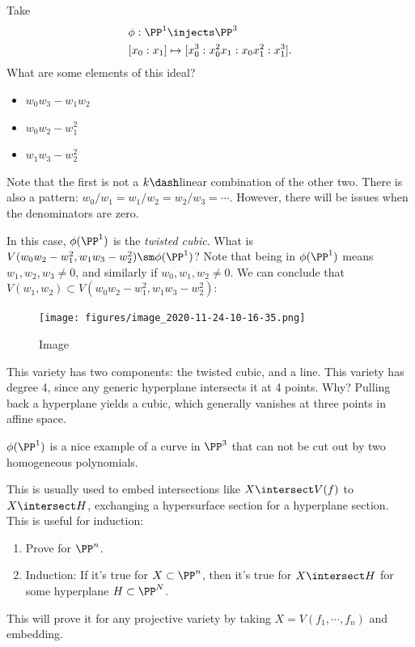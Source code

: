 \begin{example}[?]

Take
\begin{align*}  
\phi: \PP^1 &\injects \PP^3 \\
[x_0: x_1] &\mapsto [x_0^3: x_0^2 x_1 : x_0 x_1^2: x_1^3]
.\end{align*} What are some elements of this ideal?

\begin{itemize}
\tightlist
\item
  \(w_0 w_3 - w_1 w_2\)
\item
  \(w_0 w_2 - w_1^2\)
\item
  \(w_1 w_3 - w_2^2\)
\end{itemize}

Note that the first is not a \(k\dash\)linear combination of the other
two. There is also a pattern:
\(w_0/w_1 = w_1 / w_2 = w_2/w_3 = \cdots\). However, there will be
issues when the denominators are zero.

In this case, \(\phi(\PP^1)\) is the \emph{twisted cubic}. What is
\(V(w_0 w_2 - w_1^2, w_1 w_3 - w_2^2) \sm \phi(\PP^1)\)? Note that being
in \(\phi(\PP^1)\) means \(w_1, w_2, w_3 \neq 0\), and similarly if
\(w_0, w_1, w_2 \neq 0\). We can conclude that
\(V(w_1, w_2) \subset V(w_0 w_2 - w_1^2, w_1 w_3 - w_2^2)\):

\begin{figure}
\centering
\texttt{[image: figures/image\_2020-11-24-10-16-35.png]}
\caption{Image}
\end{figure}

This variety has two components: the twisted cubic, and a line. This
variety has degree 4, since any generic hyperplane intersects it at 4
points. Why? Pulling back a hyperplane yields a cubic, which generally
vanishes at three points in affine space.

\end{example}

\begin{remark}

\(\phi(\PP^1)\) is a nice example of a curve in \(\PP^3\) that can not
be cut out by two homogeneous polynomials.

\end{remark}

\begin{remark}

This is usually used to embed intersections like \(X\intersect V(f)\) to
\(X\intersect H\), exchanging a hypersurface section for a hyperplane
section. This is useful for induction:

\begin{enumerate}
\def\labelenumi{\arabic{enumi}.}
\tightlist
\item
  Prove for \(\PP^n\).
\item
  Induction: If it's true for \(X \subset\PP^n\), then it's true for
  \(X \intersect H\) for some hyperplane \(H \subset\PP^N\).
\end{enumerate}

This will prove it for any projective variety by taking
\(X = V(f_1, \cdots, f_n)\) and embedding.

\end{remark}

